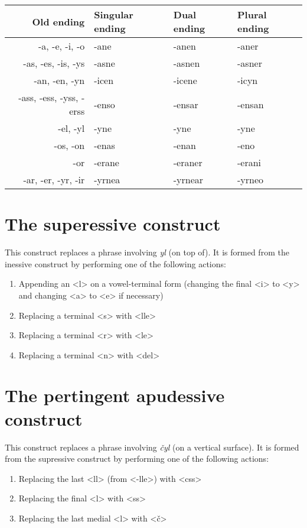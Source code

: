 \documentclass{book}
\begin{document}
\begin{center}
  \begin{tabular}{|r|l|l|l|}
    \hline
    Old ending & Singular ending & Dual ending & Plural ending \\ \hline
    -a, -e, -i, -o & -ane & -anen & -aner \\
    -as, -es, -is, -ys & -asne & -asnen & -asner \\
    -an, -en, -yn & -icen & -icene & -icyn \\
    -ass, -ess, -yss, -erss & -enso & -ensar & -ensan \\
    -el, -yl & -yne & -yne & -yne \\
    -os, -on & -enas & -enan & -eno \\
    -or & -erane & -eraner & -erani \\
    -ar, -er, -yr, -ir & -yrnea & -yrnear & -yrneo \\ \hline
  \end{tabular}
\end{center}

\section{The superessive construct}

This construct replaces a phrase involving \emph{yl} (on top of). It is formed from the inessive construct by performing one of the following actions:

\begin{enumerate}
  \item Appending an <l> on a vowel-terminal form (changing the final <i> to <y> and changing <a> to <e> if necessary)
  \item Replacing a terminal <s> with <lle>
  \item Replacing a terminal <r> with <le>
  \item Replacing a terminal <n> with <del>
\end{enumerate}

\section{The pertingent apudessive construct}

This construct replaces a phrase involving \emph{čyl} (on a vertical surface). It is formed from the supressive construct by performing one of the following actions:

\begin{enumerate}
  \item Replacing the last <ll> (from <-lle>) with <css>
  \item Replacing the final <l> with <ss>
  \item Replacing the last medial <l> with <č>
\end{enumerate}
\end{document}
